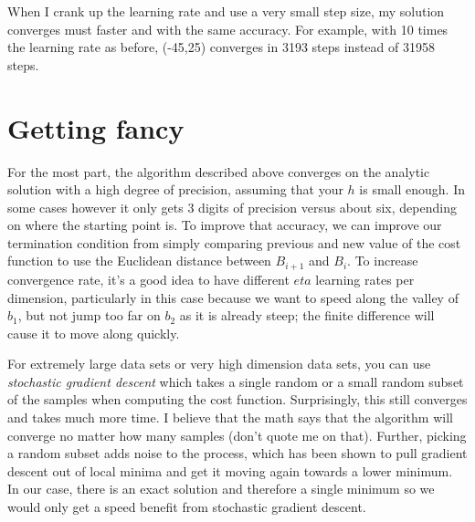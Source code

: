 \begin{fullwidth}
\noindent {}

When I crank up the learning rate and use a very small step size, my solution converges must faster and with the same accuracy. For example, with 10 times the learning rate as before, (-45,25) converges in 3193 steps instead of 31958 steps.

\section{Getting fancy}

For the most part, the algorithm described above converges on the analytic solution with a high degree of precision, assuming that your $h$ is small enough. In some cases however it only gets 3 digits of precision versus about six, depending on where the starting point is. To improve that accuracy, we can improve our termination condition from simply comparing previous and new value of the cost function to use the Euclidean distance between $B_{i+1}$ and $B_i$. To increase convergence rate, it's a good idea to have different $eta$ learning rates per dimension, particularly in this case because we want to speed along the valley of $b_1$, but not jump too far on $b_2$ as it is already steep; the finite difference will cause it to move along quickly.

For extremely large data sets or very high dimension data sets, you can use {\em stochastic gradient descent} which takes a single random or a small random subset of the samples when computing the cost function. Surprisingly, this still converges and takes much more time. I believe that the math says that the algorithm will converge no matter how many samples (don't quote me on that). Further, picking a random subset adds noise to the process, which has been shown to pull gradient descent out of local minima and get it moving again towards a lower minimum. In our case, there is an exact solution and therefore a single minimum so we would only get a speed benefit from stochastic gradient descent.


\end{fullwidth}
